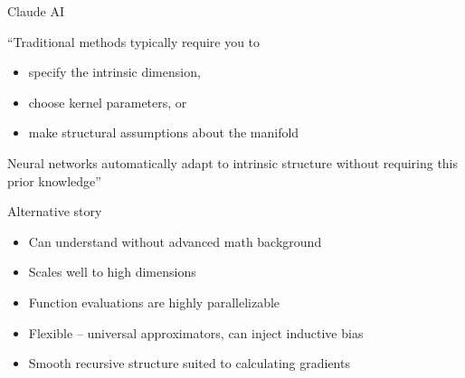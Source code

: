 \documentclass[xcolor=dvipsnames, 10pt]{beamer}
\begin{document}
\begin{frame}{Claude AI}
    
    ``Traditional methods typically require you to 
    \begin{itemize}
        \item specify the intrinsic dimension, 
    \medskip
        \item choose kernel parameters, or 
    \medskip
        \item make structural assumptions about the manifold 
    \end{itemize}

    \medskip
    Neural networks automatically adapt to 
    intrinsic structure without requiring this prior knowledge''

    \medskip
    \medskip
    \medskip
    \pause

    \begin{center}
    \end{center}

\end{frame}

\begin{frame}{Alternative story}


    \begin{itemize}
        \item Can understand without advanced math background
        \vspace{0.5em}
        \item Scales well to high dimensions 
        \vspace{0.5em}
        \item Function evaluations are highly parallelizable
        \vspace{0.5em}
        \item Flexible -- universal approximators, can inject inductive bias
        \vspace{0.5em}
        \item Smooth recursive structure suited to calculating gradients
    \end{itemize}

\end{frame}
\end{document}

